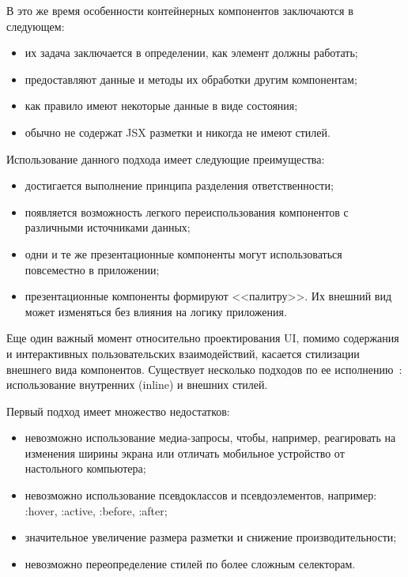В это же время особенности контейнерных компонентов заключаются в следующем:

\begin{itemize}
	\item их задача заключается в определении, как элемент должны работать;
	\item предоставляют данные и методы их обработки другим компонентам;
	\item как правило имеют некоторые данные в виде состояния;
	\item обычно не содержат JSX разметки и никогда не имеют стилей.
\end{itemize}

Использование данного подхода имеет следующие преимущества:

\begin{itemize}
	\item достигается выполнение принципа разделения ответственности;
	\item появляется возможность легкого переиспользования компонентов с различными источниками данных;
	\item одни и те же презентационные компоненты могут использоваться повсеместно в приложении;
	\item презентационные компоненты формируют <<палитру>>. Их внешний вид может изменяться без влияния на логику приложения.
\end{itemize}

Еще один важный момент относительно проектирования UI, помимо содержания и интерактивных пользовательских
взаимодействий, касается стилизации внешнего вида компонентов. Существует несколько подходов по ее
исполнению~\cite{styling_react}: использование внутренних (inline) и внешних стилей.

Первый подход имеет множество недостатков:

\begin{itemize}
  \item невозможно использование медиа-запросы, чтобы, например, реагировать на изменения ширины экрана или отличать
  мобильное устройство от настольного компьютера;
	\item невозможно использование псевдоклассов и псевдоэлементов, например: :hover, :active, :before, :after;
	\item значительное увеличение размера разметки и снижение производительности;
	\item невозможно переопределение стилей по более сложным селекторам.
\end{itemize}

